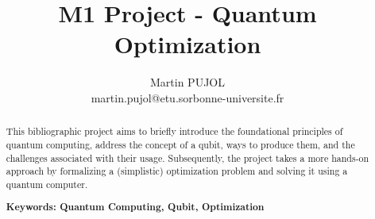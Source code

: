 \documentclass{article}
\begin{document}
\title{M1 Project - Quantum Optimization}
\author{Martin PUJOL \\ martin.pujol@etu.sorbonne-universite.fr}
\date{}

\maketitle
\thispagestyle{fancy}


\begin{abstract}

This bibliographic project aims to briefly introduce the foundational principles of quantum computing, address the concept of a qubit, ways to produce them, and the challenges associated with their usage. Subsequently, the project takes a more hands-on approach by formalizing a (simplistic) optimization problem and solving it using a quantum computer.

\textbf{Keywords: Quantum Computing, Qubit, Optimization}

\end{abstract}
\end{document}
